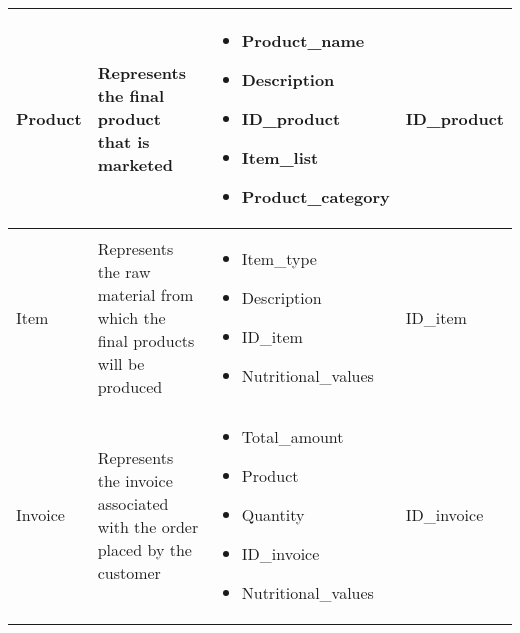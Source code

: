 \begin{longtable}{|p{}|p{} |p{}|p{} |}
    Product & Represents the final product that is marketed &
    \begin{itemize}
        \vspace{-1em}
        \item Product\_name
        \item Description
        \item ID\_product
        \item Item\_list
        \item Product\_category
    \end{itemize}
    &  ID\_product \\\hline

    Item & Represents the raw material from which the final products will be produced &
    \begin{itemize}
        \vspace{-1em}
        \item Item\_type
        \item Description
        \item ID\_item
        \item Nutritional\_values
    \end{itemize}
    &  ID\_item \\\hline

    Invoice & Represents the invoice associated with the order placed by the customer &
        \begin{itemize}
            \vspace{-1em}
            \item Total\_amount
            \item Product
            \item Quantity
            \item ID\_invoice
            \item Nutritional\_values
        \end{itemize}
        &  ID\_invoice \\\hline
\end{longtable}